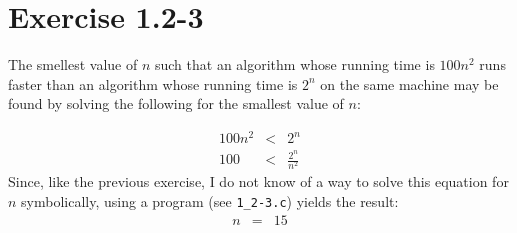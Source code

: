 \documentclass{article}
\begin{document}
\section*{Exercise 1.2-3}

The smellest value of $n$ such that an algorithm whose running time is $100n^2$ runs faster than an algorithm whose running time is $2^n$ on the same machine may be found by solving the following for the smallest value of $n$:

\begin{eqnarray*}
	100n^2 & < & 2^n \\
	100 & < & \frac{2^n}{n^2}
\end{eqnarray*}
Since, like the previous exercise, I do not know of a way to solve this equation for $n$ symbolically, using a program (see \texttt{1\_2-3.c}) yields the result:
\begin{eqnarray*}
	n & = & 15
\end{eqnarray*}
\end{document}
